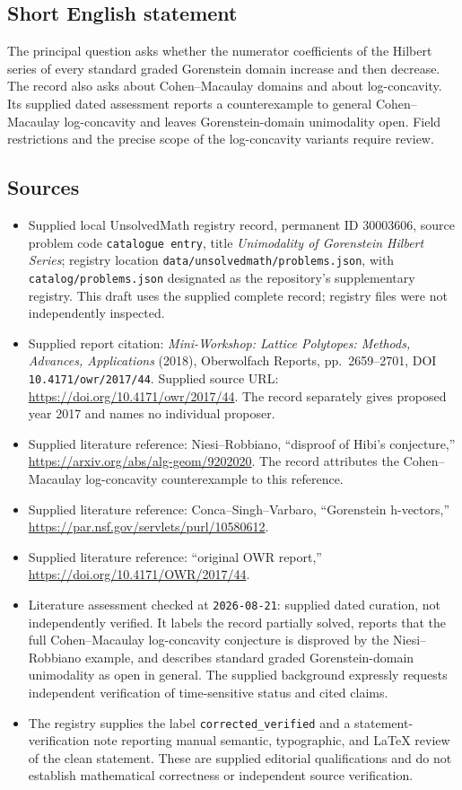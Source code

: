 \documentclass[11pt]{article}
\begin{document}
\subsection{Short English statement}
The principal question asks whether the numerator coefficients of the Hilbert series of every standard graded Gorenstein domain increase and then decrease. The record also asks about Cohen--Macaulay domains and about log-concavity. Its supplied dated assessment reports a counterexample to general Cohen--Macaulay log-concavity and leaves Gorenstein-domain unimodality open. Field restrictions and the precise scope of the log-concavity variants require review.
\subsection{Sources}
\begin{itemize}
\item Supplied local UnsolvedMath registry record, permanent ID \(30003606\), source problem code \texttt{catalogue entry}, title \emph{Unimodality of Gorenstein Hilbert Series}; registry location \texttt{data/unsolvedmath/problems.json}, with \texttt{catalog/problems.json} designated as the repository's supplementary registry. This draft uses the supplied complete record; registry files were not independently inspected.
\item Supplied report citation: \emph{Mini-Workshop: Lattice Polytopes: Methods, Advances, Applications} (2018), Oberwolfach Reports, pp.\ 2659--2701, DOI \texttt{10.4171/owr/2017/44}. Supplied source URL: \url{https://doi.org/10.4171/owr/2017/44}. The record separately gives proposed year 2017 and names no individual proposer.
\item Supplied literature reference: Niesi--Robbiano, ``disproof of Hibi's conjecture,'' \url{https://arxiv.org/abs/alg-geom/9202020}. The record attributes the Cohen--Macaulay log-concavity counterexample to this reference.
\item Supplied literature reference: Conca--Singh--Varbaro, ``Gorenstein h-vectors,'' \url{https://par.nsf.gov/servlets/purl/10580612}.
\item Supplied literature reference: ``original OWR report,'' \url{https://doi.org/10.4171/OWR/2017/44}.
\item Literature assessment checked at \texttt{2026-08-21}: supplied dated curation, not independently verified. It labels the record partially solved, reports that the full Cohen--Macaulay log-concavity conjecture is disproved by the Niesi--Robbiano example, and describes standard graded Gorenstein-domain unimodality as open in general. The supplied background expressly requests independent verification of time-sensitive status and cited claims.
\item The registry supplies the label \texttt{corrected\_verified} and a statement-verification note reporting manual semantic, typographic, and LaTeX review of the clean statement. These are supplied editorial qualifications and do not establish mathematical correctness or independent source verification.
\end{itemize}
\end{document}
